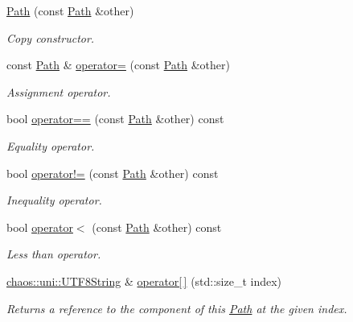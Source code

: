 \begin{DoxyCompactItemize}
\hyperlink{classchaos_1_1io_1_1sys_1_1_path_a40b3bf651b667adbd3eeb1ee55564211}{Path} (const \hyperlink{classchaos_1_1io_1_1sys_1_1_path}{Path} \&other)
\begin{DoxyCompactList}\small\item\em Copy constructor. \end{DoxyCompactList}\item 
const \hyperlink{classchaos_1_1io_1_1sys_1_1_path}{Path} \& \hyperlink{classchaos_1_1io_1_1sys_1_1_path_a45c70fc34ff619e890d5bc807dd70d8b}{operator=} (const \hyperlink{classchaos_1_1io_1_1sys_1_1_path}{Path} \&other)
\begin{DoxyCompactList}\small\item\em Assignment operator. \end{DoxyCompactList}\item 
bool \hyperlink{classchaos_1_1io_1_1sys_1_1_path_ac2e63307a0526625f4447f1d2a704e3b}{operator==} (const \hyperlink{classchaos_1_1io_1_1sys_1_1_path}{Path} \&other) const 
\begin{DoxyCompactList}\small\item\em Equality operator. \end{DoxyCompactList}\item 
bool \hyperlink{classchaos_1_1io_1_1sys_1_1_path_acd6dea0a797c0307179a5523239a299a}{operator!=} (const \hyperlink{classchaos_1_1io_1_1sys_1_1_path}{Path} \&other) const 
\begin{DoxyCompactList}\small\item\em Inequality operator. \end{DoxyCompactList}\item 
bool \hyperlink{classchaos_1_1io_1_1sys_1_1_path_a90858bbce348d5b36d0c31d771c601d8}{operator$<$} (const \hyperlink{classchaos_1_1io_1_1sys_1_1_path}{Path} \&other) const 
\begin{DoxyCompactList}\small\item\em Less than operator. \end{DoxyCompactList}\item 
\hyperlink{classchaos_1_1uni_1_1_u_t_f8_string}{chaos\+::uni\+::\+U\+T\+F8\+String} \& \hyperlink{classchaos_1_1io_1_1sys_1_1_path_af04cdedb77f8b81825dea5e830f8d28f}{operator\mbox{[}$\,$\mbox{]}} (std\+::size\+\_\+t index)
\begin{DoxyCompactList}\small\item\em Returns a reference to the component of this \hyperlink{classchaos_1_1io_1_1sys_1_1_path}{Path} at the given index. \end{DoxyCompactList}\item 

\end{DoxyCompactItemize}
